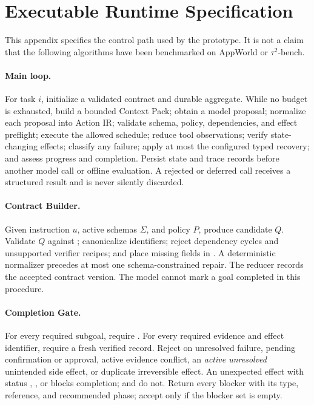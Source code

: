 \section{Executable Runtime Specification}
\label{app:runtime-specification}

This appendix specifies the control path used by the prototype. It is not a claim
that the following algorithms have been benchmarked on AppWorld or $\tau^2$-bench.

\paragraph{Main loop.} For task $i$, initialize a validated contract and durable
aggregate. While no budget is exhausted, build a bounded Context Pack; obtain a
model proposal; normalize each proposal into Action IR; validate schema, policy,
dependencies, and effect preflight; execute the allowed schedule; reduce tool
observations; verify state-changing effects; classify any failure; apply at most the
configured typed recovery; and assess progress and completion. Persist state and
trace records before another model call or offline evaluation. A rejected or
deferred call receives a structured result and is never silently discarded.

\paragraph{Contract Builder.} Given instruction $u$, active schemas $\Sigma$, and
policy $P$, produce candidate $Q$. Validate $Q$ against
;
canonicalize identifiers; reject dependency cycles and unsupported verifier
recipes; and place missing fields in . A deterministic normalizer
precedes at most one schema-constrained repair. The reducer records the accepted
contract version. The model cannot mark a goal completed in this procedure.

\paragraph{Completion Gate.} For every required subgoal, require
. For every required evidence and effect identifier,
require a fresh verified record. Reject on unresolved failure, pending confirmation
or approval, active evidence conflict, an \emph{active unresolved} unintended side
effect, or duplicate irreversible effect. An unexpected effect with status
, , or  blocks completion;
 and  do not. Return every blocker with
its type, reference, and recommended
phase; accept only if the blocker set is empty.

